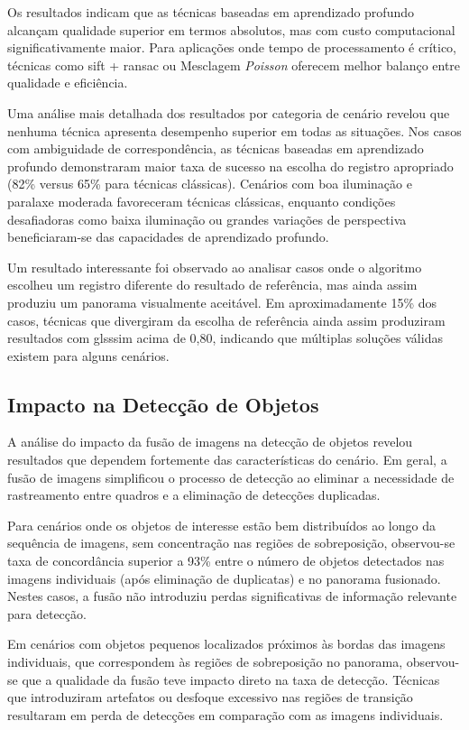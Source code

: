 Os resultados indicam que as técnicas baseadas em aprendizado profundo alcançam qualidade superior em termos absolutos, mas com custo computacional significativamente maior. Para aplicações onde tempo de processamento é crítico, técnicas como \gls{sift} + \gls{ransac} ou Mesclagem \textit{Poisson} oferecem melhor balanço entre qualidade e eficiência.

Uma análise mais detalhada dos resultados por categoria de cenário revelou que nenhuma técnica apresenta desempenho superior em todas as situações. Nos casos com ambiguidade de correspondência, as técnicas baseadas em aprendizado profundo demonstraram maior taxa de sucesso na escolha do registro apropriado (82\% versus 65\% para técnicas clássicas). Cenários com boa iluminação e paralaxe moderada favoreceram técnicas clássicas, enquanto condições desafiadoras como baixa iluminação ou grandes variações de perspectiva beneficiaram-se das capacidades de aprendizado profundo.

Um resultado interessante foi observado ao analisar casos onde o algoritmo escolheu um registro diferente do resultado de referência, mas ainda assim produziu um panorama visualmente aceitável. Em aproximadamente 15\% dos casos, técnicas que divergiram da escolha de referência ainda assim produziram resultados com gls{ssim} acima de 0,80, indicando que múltiplas soluções válidas existem para alguns cenários.

\subsection{Impacto na Detecção de Objetos}

A análise do impacto da fusão de imagens na detecção de objetos revelou resultados que dependem fortemente das características do cenário. Em geral, a fusão de imagens simplificou o processo de detecção ao eliminar a necessidade de rastreamento entre quadros e a eliminação de detecções duplicadas.

Para cenários onde os objetos de interesse estão bem distribuídos ao longo da sequência de imagens, sem concentração nas regiões de sobreposição, observou-se taxa de concordância superior a 93\% entre o número de objetos detectados nas imagens individuais (após eliminação de duplicatas) e no panorama fusionado. Nestes casos, a fusão não introduziu perdas significativas de informação relevante para detecção.

Em cenários com objetos pequenos localizados próximos às bordas das imagens individuais, que correspondem às regiões de sobreposição no panorama, observou-se que a qualidade da fusão teve impacto direto na taxa de detecção. Técnicas que introduziram artefatos ou desfoque excessivo nas regiões de transição resultaram em perda de detecções em comparação com as imagens individuais.

